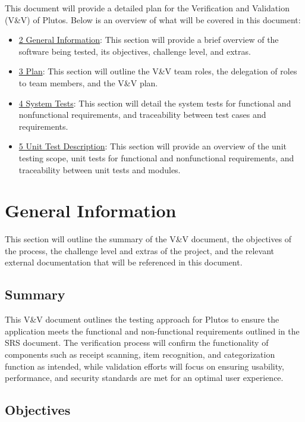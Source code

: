 \documentclass[12pt, titlepage]{article}
\begin{document}
This document will provide a detailed plan for the Verification and Validation
(V\&V) of Plutos. Below is an overview of what will be covered in this document:
\begin{itemize}
	\item \hyperlink{section.2}{2 General Information}: This section will provide a brief overview of
	the software being tested, its objectives, challenge level, and extras.
	\item \hyperlink{section.3}{3 Plan}: This section will outline the V\&V team roles, the delegation
	of roles to team members, and the V\&V plan.
	\item \hyperlink{section.4}{4 System Tests}: This section will detail the system tests for
	functional and nonfunctional requirements, and traceability between test
	cases and requirements.
	\item \hyperlink{section.5}{5 Unit Test Description}: This section will provide an overview of the
	unit testing scope, unit tests for functional and nonfunctional
	requirements, and traceability between unit tests and modules.
\end{itemize}


\newpage

\section{General Information}

This section will outline the summary of the V\&V document, the objectives of
the process, the challenge level and extras of the project, and the relevant
external documentation that will be referenced in this document.

\subsection{Summary}

This V\&V document outlines the testing approach for Plutos to ensure the
application meets the functional and non-functional requirements outlined in the
SRS document. The verification process will confirm the functionality of
components such as receipt scanning, item recognition, and categorization
function as intended, while validation efforts will focus on ensuring usability,
performance, and security standards are met for an optimal user experience.


\subsection{Objectives}
\end{document}
